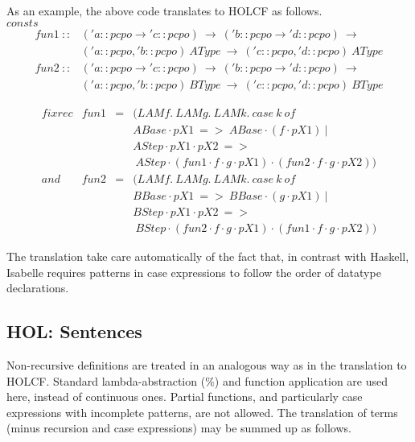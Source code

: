 \documentclass{llncs}
\begin{document}
\noindent As an example, the above code translates to HOLCF as follows.\\

\noindent $consts $ 
$$
\begin{array}{ll} fun1 \ :: & ('a::pcpo \to 'c::pcpo) \ \to \ ('b::pcpo \to 'd::pcpo) \ \to \\
  & ('a::pcpo, 'b::pcpo) \ AType \ \to \ ('c::pcpo, 'd::pcpo) \ AType \\
  fun2 \ :: & ('a::pcpo \to 'c::pcpo) \ \to \ ('b::pcpo \to
  'd::pcpo) \ \to \\
  & ('a::pcpo, 'b::pcpo) \ BType \ \to \ ('c::pcpo, 'd::pcpo) \ BType
\end{array}$$

$$\begin{array}{rccl} 
  fixrec & fun1 & = & (LAM f. \ LAM g. \ LAM k. \ case \ k \ of \\
  & & & ABase \cdot pX1 \ => \ ABase \cdot (f \cdot pX1) \ | \\
  & & & AStep \cdot pX1 \cdot pX2 \ => \\
  & & & \ AStep \cdot (fun1 \cdot f \cdot g \cdot pX1) \cdot (fun2 \cdot f \cdot g \cdot pX2)) \\
  and & fun2 & = & (LAM f. \ LAM g. \ LAM k. \ case \ k \ of \\
  & & & BBase \cdot pX1 \ => \ BBase \cdot (g \cdot pX1) \ | \\
  & & & BStep \cdot pX1 \cdot pX2 \ => \\
  & & & \ BStep \cdot (fun2 \cdot f \cdot g \cdot pX1) \cdot (fun1 \cdot f \cdot g \cdot pX2)) \end{array}$$

\noindent The translation take care automatically of the fact that,
in contrast with Haskell, Isabelle requires patterns in case expressions to
follow the order of datatype declarations.


\subsection{HOL: Sentences}

Non-recursive definitions are treated in an analogous way as in the
translation to HOLCF. Standard lambda-abstraction ($\%$) and function
application are used here, instead of continuous ones. Partial functions, and
particularly case expressions with incomplete patterns, are not allowed. The
translation of terms (minus recursion and case expressions) may be summed up
as follows.
\end{document}
